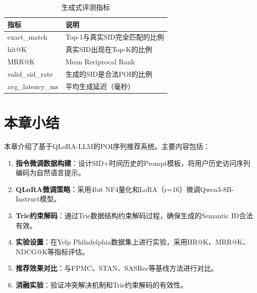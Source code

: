 \begin{table}[htbp]
\centering
\caption{生成式评测指标}
\label{tab:gen_metrics}
\begin{tabular}{ll}
\toprule
指标 & 说明 \\
\midrule
exact\_match & Top-1与真实SID完全匹配的比例 \\
hit@K & 真实SID出现在Top-K的比例 \\
MRR@K & Mean Reciprocal Rank \\
valid\_sid\_rate & 生成的SID是合法POI的比例 \\
avg\_latency\_ms & 平均生成延迟（毫秒） \\
\bottomrule
\end{tabular}
\end{table}

\section{本章小结}
\label{sec:chapter4_summary}

本章介绍了基于QLoRA-LLM的POI序列推荐系统。主要内容包括：

\begin{enumerate}
    \item \textbf{指令微调数据构建}：设计SID+时间历史的Prompt模板，将用户历史访问序列编码为自然语言提示。
    \item \textbf{QLoRA微调策略}：采用4bit NF4量化和LoRA（r=16）微调Qwen3-8B-Instruct模型。
    \item \textbf{Trie约束解码}：通过Trie数据结构约束解码过程，确保生成的Semantic ID合法有效。
    \item \textbf{实验设置}：在Yelp Philadelphia数据集上进行实验，采用HR@K、MRR@K、NDCG@K等指标评估。
    \item \textbf{推荐效果对比}：与FPMC、STAN、SASRec等基线方法进行对比。
    \item \textbf{消融实验}：验证冲突解决机制和Trie约束解码的有效性。
\end{enumerate}
